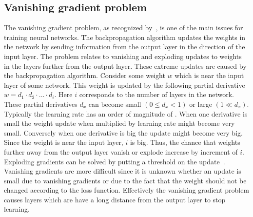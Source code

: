 \subsection{Vanishing gradient problem}
\label{subsec:vanishing_gradient_problem}
The vanishing gradient problem, as recognized by~\citet{hochreiter2001gradient}, is one of the main issues for training neural networks.
The backpropagation algorithm updates the weights in the network by sending information from the output layer in the direction of the input layer.
The problem relates to vanishing and exploding updates to weights in the layers further from the output layer.
These extreme updates are caused by the backpropagation algorithm.
Consider some weight $w$ which is near the input layer of some network.
This weight is updated by the following partial derivative $w = d_1 \cdot d_2 \cdot \ldots \cdot d_i$.
Here $i$ corresponds to the number of layers in the network.
These partial derivatives $d_x$ can become small $(0 \leq d_x < 1)$ or large $(1 \ll d_x)$.
Typically the learning rate has an order of magnitude of .
When one derivative is small the weight update when multiplied by learning rate might become very small.
Conversely when one derivative is big the update might become very big.
Since the weight is near the input layer, $i$ is big.
Thus, the chance that weights further away from the output layer vanish or explode increase by increment of $i$.
Exploding gradients can be solved by putting a threshold on the update~\citep{mikolov2013distributed}.
Vanishing gradients are more difficult since it is unknown whether an update is small due to vanishing gradients or due to the fact that the weight should not be changed according to the loss function.
Effectively the vanishing gradient problem causes layers which are have a long distance from the output layer to stop learning.

